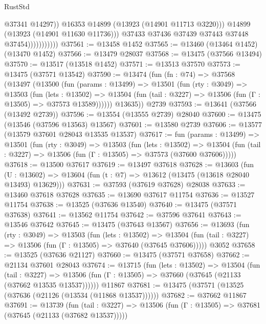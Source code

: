 \begin{lexlean}{RustStd}
\begin{coremodule}
                                  @37341
                                  @14297))
                              @16353
                              @14899
                              (@13923 (@14901 @11713 @3220)))
                            @14899
                            (@13923 (@14901 @11630 @11736)))
                          @37433
                          @37436
                          @37439
                          @37443
                          @37448
                          @37454)))))))))))
@37561 := @13458 @1452
@37565 := @13460 (@13464 @1452) (@13470 @1452)
@37566 := @13479 @28037
@37568 := @13475 (@37566 @13494)
@37570 := @13517 (@13518 @1452)
@37571 := @13513 @37570
@37573 := @13475 (@37571 @13542)
@37590 := @13474
    (fun (fn : @74) =>
    @37568
      (@13497
        (@13500
          (fun (params : @13499) =>
          @13501
            (fun (rty : @3049) =>
            @13503
              (fun (lets : @13502) =>
              @13504 (fun (tail : @3227) => @13506 (fun (Γ : @13505) => @37573 @13589))))))
        @13635))
    @2739
@37593 := @13641 (@37566 (@13492 @2739))
@37596 := @13554 (@13555 @2739) @28040
@37600 := @13475 (@13546 (@37596 @13563) @13567)
@37601 := @13580 @2739
@37606 := @13577 (@13579 @37601 @28043 @13535 @13537)
@37617 := fun (params : @13499) =>
  @13501
    (fun (rty : @3049) =>
    @13503
      (fun (lets : @13502) =>
      @13504 (fun (tail : @3227) => @13506 (fun (Γ : @13505) => @37573 (@37600 @37606)))))
@37618 := @13500 @37617
@37619 := @13497 @37618
@37628 := @13603
    (fun (U : @13602) => @13604 (fun (t : @7) => @13612 (@13475 (@13618 @28040 @13493) @13629)))
@37631 := @37593 (@37619 @37628) @28038
@37633 := @13460 @37618 @37628
@37635 := @13690 @37617 @11754
@37636 := @13527 @11754
@37638 := @13525 (@37636 @13540)
@37640 := @13475 (@37571 @37638)
@37641 := @13562 @11754
@37642 := @37596 @37641
@37643 := @13546 @37642
@37645 := @13475 (@37643 @13567)
@37656 := @13693
    (fun (rty : @3049) =>
    @13503
      (fun (lets : @13502) =>
      @13504 (fun (tail : @3227) => @13506 (fun (Γ : @13505) => @37640 (@37645 @37606)))))
    @3052
@37658 := @13525 (@37636 @21127)
@37660 := @13475 (@37571 @37658)
@37662 := @21134 @37601 @28043
@37674 := @13715
    (fun (lets : @13502) =>
    @13504
      (fun (tail : @3227) =>
      @13506 (fun (Γ : @13505) => @37660 (@37645 (@21133 (@37662 @13535 @13537))))))
    @11867
@37681 := @13475 (@37571 (@13525 (@37636 (@21126 (@13534 (@11868 @13537))))))
@37682 := @37662 @11867
@37691 := @13739
    (fun (tail : @3227) => @13506 (fun (Γ : @13505) => @37681 (@37645 (@21133 (@37682 @13537)))))

\end{coremodule}
\end{lexlean}
